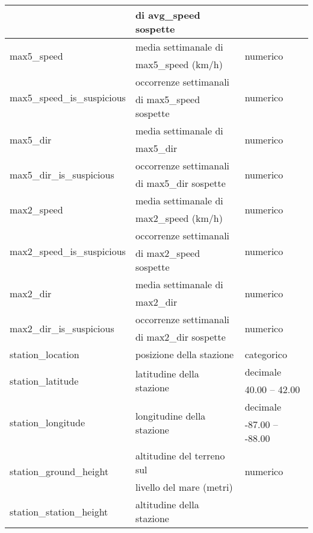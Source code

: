 \begin{longtable}{lll}
	& di avg\_speed sospette &	 \\	\hline		
	\multirow{2}{*}{max5\_speed}	& media settimanale di  & 
	\multirow{2}{*}{numerico}	\\
	& max5\_speed (km/h) &\\\hline	
	\multirow{2}{*}{max5\_speed\_is\_suspicious}		& occorrenze 
	settimanali & \multirow{2}{*}{numerico}	\\
	& di max5\_speed sospette &  \\	\hline		
	\multirow{2}{*}{max5\_dir} & media settimanale di  & 	
	\multirow{2}{*}{numerico} \\
	&max5\_dir&\\ \hline
	\multirow{2}{*}{max5\_dir\_is\_suspicious}		& occorrenze settimanali & 
	\multirow{2}{*}{numerico}	\\
	& di max5\_dir sospette & \\ \hline	
	\multirow{2}{*}{max2\_speed}	& media settimanale di 	 & 	
	\multirow{2}{*}{numerico}	\\ 
	& max2\_speed (km/h) &\\	\hline		
	\multirow{2}{*}{max2\_speed\_is\_suspicious} & occorrenze settimanali & 
	\multirow{2}{*}{numerico}	\\
	& di max2\_speed sospette &  \\	\hline			
	\multirow{2}{*}{max2\_dir}	& media settimanale di  & 		
	\multirow{2}{*}{numerico} \\ 
	& max2\_dir & \\ \hline
	\multirow{2}{*}{max2\_dir\_is\_suspicious}		& occorrenze settimanali & 
	\multirow{2}{*}{numerico}	\\
	& di max2\_dir sospette &  \\ \hline
	station\_location & posizione della stazione & categorico \\	\hline
	\multirow{2}{*}{station\_latitude}	& \multirow{2}{*}{latitudine della 
		stazione}	&  decimale    \\ 
	& & {40.00} -- {42.00}  \\ \hline
	\multirow{2}{*}{station\_longitude}	& \multirow{2}{*}{longitudine della 
		stazione} 	&  decimale     \\ 
	& & {-87.00} -- {-88.00} \\ \hline 
	\multirow{2}{*}{station\_ground\_height}	& 	altitudine del terreno sul  
	& 	\multirow{2}{*}{numerico}	\\
	& livello del mare (metri) &\\ \hline		
	\multirow{2}{*}{station\_station\_height}	& 	altitudine della stazione 

\end{longtable}
